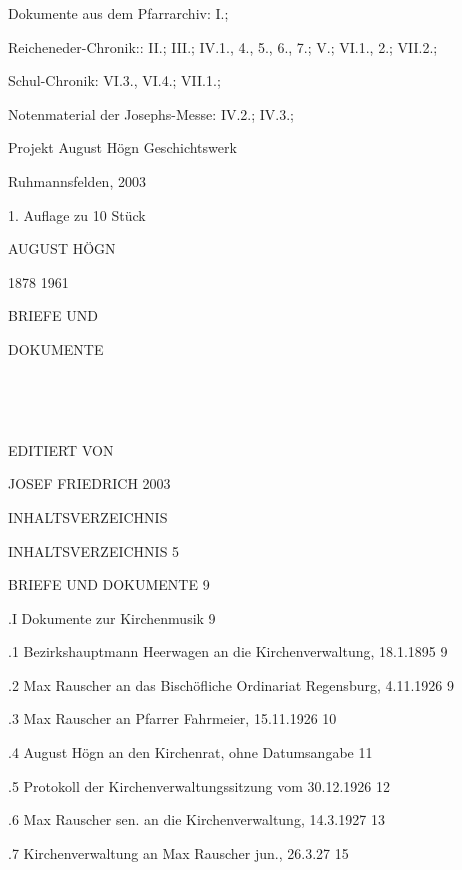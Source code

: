 Dokumente aus dem Pfarrarchiv: I.;

Reicheneder-Chronik:: II.; III.; IV.1., 4., 5.,  6.,  7.; V.; VI.1., 2.; VII.2.;

Schul-Chronik: VI.3., VI.4.; VII.1.;

Notenmaterial der Josephs-Messe: IV.2.; IV.3.;





Projekt August Högn Geschichtswerk

Ruhmannsfelden, 2003

1. Auflage zu 10 Stück

AUGUST HÖGN

1878 1961





BRIEFE UND

DOKUMENTE



























EDITIERT VON

JOSEF FRIEDRICH 2003





INHALTSVERZEICHNIS

INHALTSVERZEICHNIS  5

BRIEFE UND DOKUMENTE    9

.I Dokumente zur Kirchenmusik   9

.1 Bezirkshauptmann Heerwagen an die Kirchenverwaltung, 18.1.1895   9

.2 Max Rauscher an das Bischöfliche Ordinariat Regensburg, 4.11.1926    9

.3 Max Rauscher an Pfarrer Fahrmeier, 15.11.1926    10

.4 August Högn an den Kirchenrat, ohne Datumsangabe 11

.5 Protokoll der Kirchenverwaltungssitzung vom 30.12.1926   12

.6 Max Rauscher sen. an die Kirchenverwaltung, 14.3.1927    13

.7 Kirchenverwaltung an Max Rauscher jun., 26.3.27  15

